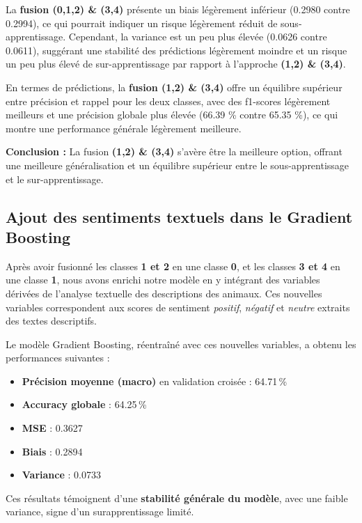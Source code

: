 \documentclass[a4paper,12pt]{article}
\begin{document}
La \textbf{fusion (0,1,2) \& (3,4)} présente un biais légèrement inférieur (0.2980 contre 0.2994), ce qui pourrait indiquer un risque légèrement réduit de sous-apprentissage. Cependant, la variance est un peu plus élevée (0.0626 contre 0.0611), suggérant une stabilité des prédictions légèrement moindre et un risque un peu plus élevé de sur-apprentissage par rapport à l'approche \textbf{(1,2) \& (3,4)}.

En termes de prédictions, la \textbf{fusion (1,2) \& (3,4)} offre un équilibre supérieur entre précision et rappel pour les deux classes, avec des f1-scores légèrement meilleurs et une précision globale plus élevée (66.39 \% contre 65.35 \%), ce qui montre une performance générale légèrement meilleure.

\textbf{Conclusion :} La fusion \textbf{(1,2) \& (3,4)} s’avère être la meilleure option, offrant une meilleure généralisation et un équilibre supérieur entre le sous-apprentissage et le sur-apprentissage.

\subsection{Ajout des sentiments textuels dans le Gradient Boosting}

Après avoir fusionné les classes \textbf{1 et 2} en une classe \textbf{0}, et les classes \textbf{3 et 4} en une classe \textbf{1}, nous avons enrichi notre modèle en y intégrant des variables dérivées de l’analyse textuelle des descriptions des animaux. Ces nouvelles variables correspondent aux scores de sentiment \textit{positif}, \textit{négatif} et \textit{neutre} extraits des textes descriptifs.

Le modèle Gradient Boosting, réentraîné avec ces nouvelles variables, a obtenu les performances suivantes :
\begin{itemize}
    \item \textbf{Précision moyenne (macro)} en validation croisée : 64.71\,\%
    \item \textbf{Accuracy globale} : 64.25\,\%
    \item \textbf{MSE} : 0.3627
    \item \textbf{Biais} : 0.2894
    \item \textbf{Variance} : 0.0733
\end{itemize}

Ces résultats témoignent d'une \textbf{stabilité générale du modèle}, avec une faible variance, signe d'un surapprentissage limité.
\end{document}
